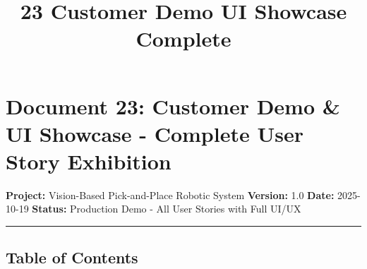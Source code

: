 \documentclass[
]{article}
\title{23 Customer Demo UI Showcase Complete}
\author{}
\date{}
\begin{document}
\maketitle

{
\setcounter{tocdepth}{3}
\tableofcontents
}
\hypertarget{document-23-customer-demo-ui-showcase---complete-user-story-exhibition}{%
\section{Document 23: Customer Demo \& UI Showcase - Complete User Story
Exhibition}\label{document-23-customer-demo-ui-showcase---complete-user-story-exhibition}}

\textbf{Project:} Vision-Based Pick-and-Place Robotic System
\textbf{Version:} 1.0 \textbf{Date:} 2025-10-19 \textbf{Status:}
Production Demo - All User Stories with Full UI/UX

\begin{center}\rule{0.5\linewidth}{0.5pt}\end{center}

\hypertarget{table-of-contents}{%
\subsection{Table of Contents}\label{table-of-contents}}
\end{document}
